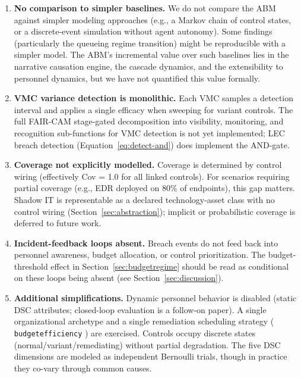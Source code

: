 \documentclass[11pt,a4paper]{article}
\DeclareRobustCommand{\code}[1]{%
  \begingroup
  \def\_{\textunderscore\allowbreak}%
  \texttt{#1}%
  \endgroup}
\begin{document}
\begin{enumerate}[nosep]
    \item \textbf{No comparison to simpler baselines.} We do not compare the ABM against simpler modeling approaches (e.g., a Markov chain of control states, or a discrete-event simulation without agent autonomy). Some findings (particularly the queueing regime transition) might be reproducible with a simpler model. The ABM's incremental value over such baselines lies in the narrative causation engine, the cascade dynamics, and the extensibility to personnel dynamics, but we have not quantified this value formally.

    \item \textbf{VMC variance detection is monolithic.} Each VMC samples a detection interval and applies a single efficacy when sweeping for variant controls. The full FAIR-CAM stage-gated decomposition into visibility, monitoring, and recognition sub-functions for VMC detection is not yet implemented; LEC breach detection (Equation~\ref{eq:detect-and}) does implement the AND-gate.

    \item \textbf{Coverage not explicitly modelled.} Coverage is determined by control wiring (effectively Cov = 1.0 for all linked controls). For scenarios requiring partial coverage (e.g., EDR deployed on 80\% of endpoints), this gap matters. Shadow IT is representable as a declared technology-asset class with no control wiring (Section~\ref{sec:abstraction}); implicit or probabilistic coverage is deferred to future work.

    \item \textbf{Incident-feedback loops absent.} Breach events do not feed back into personnel awareness, budget allocation, or control prioritization. The budget-threshold effect in Section~\ref{sec:budgetregime} should be read as conditional on these loops being absent (see Section~\ref{sec:discussion}).

    \item \textbf{Additional simplifications.} Dynamic personnel behavior is disabled (static DSC attributes; closed-loop evaluation is a follow-on paper). A single organizational archetype and a single remediation scheduling strategy (\code{budget\_efficiency}) are exercised. Controls occupy discrete states (normal/variant/remediating) without partial degradation. The five DSC dimensions are modeled as independent Bernoulli trials, though in practice they co-vary through common causes.


\end{enumerate}
\end{document}
